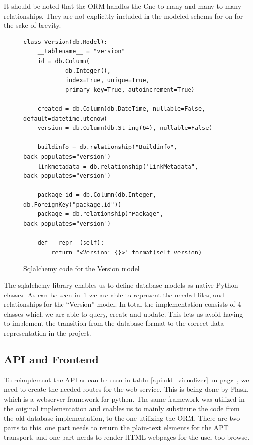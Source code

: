 \documentclass[../Main/thesis.tex]{subfiles}
\begin{document}
It should be noted that the ORM handles the One-to-many and many-to-many
relationships. They are not explicitly included in the modeled schema for on 
for the sake of brevity.

\begin{figure}[H]
\begin{verbatim}
class Version(db.Model):
    __tablename__ = "version"
    id = db.Column(
            db.Integer(),
            index=True, unique=True, 
            primary_key=True, autoincrement=True)

    created = db.Column(db.DateTime, nullable=False, default=datetime.utcnow)
    version = db.Column(db.String(64), nullable=False)

    buildinfo = db.relationship("Buildinfo", back_populates="version")
    linkmetadata = db.relationship("LinkMetadata", back_populates="version")

    package_id = db.Column(db.Integer, db.ForeignKey("package.id"))
    package = db.relationship("Package", back_populates="version")

    def __repr__(self):
        return "<Version: {}>".format(self.version)
\end{verbatim}
\caption{Sqlalchemy code for the Version model}
\label{fig:version-model}
\end{figure}

The sqlalchemy library enables us to define database models as native Python
classes. As can be seen in~\ref{fig:version-model} we are able to represent the
needed files, and relationships for the ``Version'' model. In total the
implementation consists of 4 classes which we are able to query, create and
update. This lets us avoid having to implement the transition from the database
format to the correct data representation in the project.

\subsection*{API and Frontend}%
\label{sub:api_and_frontend}

To reimplement the API as can be seen in table~\ref{api:old_visualizer} on
page~\pageref{api:old_visualizer}, we need to create the needed routes for the
web service. This is being done by Flask, which is a webserver framework for
python. The same framework was utilized in the original implementation and
enables us to mainly substitute the code from the old database implementation,
to the one utilizing the ORM. There are two parts to this, one part needs to
return the plain-text elements for the APT transport, and one part needs to
render HTML webpages for the user too browse.
\end{document}
